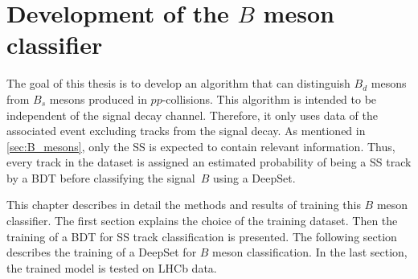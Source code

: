 \chapter{Development of the $B$ meson classifier}

The goal of this thesis is to develop an algorithm that can distinguish $B_d$ mesons from $B_s$ mesons produced in $pp$-collisions.
This algorithm is intended to be independent of the signal decay channel. 
Therefore, it only uses data of the associated event excluding tracks from the signal decay.
As mentioned in \cref{sec:B_mesons}, only the SS is expected to contain relevant information.
Thus, every track in the dataset is assigned an estimated probability of being a SS track by a BDT before classifying the signal~$B$ using a DeepSet.

This chapter describes in detail the methods and results of training this $B$ meson classifier.
The first section explains the choice of the training dataset.
Then the training of a BDT for SS track classification is presented.
The following section describes the training of a DeepSet for $B$ meson classification.
In the last section, the trained model is tested on LHCb data.




